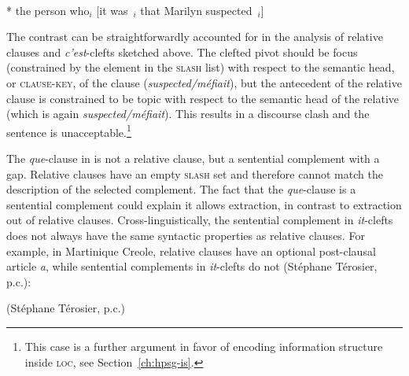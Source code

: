 \eal 
\ex \citep[759]{Bresnan.1987}\\
* the person who$_i$ [it was~\trace{}$_i$ that Marilyn suspected~\trace{}$_i$]
\zl 

The contrast can be straightforwardly accounted for in the analysis of relative clauses and \emph{c'est}-clefts sketched above. The clefted pivot should be focus (constrained by the element in the \textsc{slash} list) with respect to the semantic head, or \textsc{clause-key}, of the clause (\emph{suspected/méfiait}), but the antecedent of the relative clause is constrained to be topic with respect to the semantic head of the relative (which is again \emph{suspected/méfiait}). This results in a discourse clash and the sentence is unacceptable.\footnote{This case is a further argument in favor of encoding information structure inside \textsc{loc}, see Section~\ref{ch:hpsg-is}.}


The \emph{que}-clause in  is not a relative clause, but a sentential complement with a gap. Relative clauses have an empty \textsc{slash} set and therefore cannot match the description of the selected complement. The fact that the \emph{que}-clause is a sentential complement could explain it allows extraction, in contrast to extraction out of relative clauses. Cross-linguistically, the sentential complement in \emph{it}-clefts does not always have the same syntactic properties as relative clauses. For example, in Martinique Creole, relative clauses have an optional post-clausal article \emph{a}, while sentential complements in \emph{it}-clefts do not (Stéphane Térosier, p.c.):

\begin{exe}
\ex (Stéphane Térosier, p.c.)
\begin{xlist}
\end{xlist}
\end{exe}

